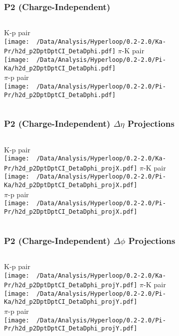 \documentclass{beamer}
\begin{document}
\begin{frame}
	\frametitle{P2 (Charge-Independent)}
	\begin{columns}
		\centering
		K-p pair\\
		\texttt{[image: ~/Data/Analysis/Hyperloop/0.2-2.0/Ka-Pr/h2d\_p2DptDptCI\_DetaDphi.pdf]}
		\centering
		$\pi$-K pair\\
		\texttt{[image: ~/Data/Analysis/Hyperloop/0.2-2.0/Pi-Ka/h2d\_p2DptDptCI\_DetaDphi.pdf]}\\$\pi$-p pair\\
		\texttt{[image: ~/Data/Analysis/Hyperloop/0.2-2.0/Pi-Pr/h2d\_p2DptDptCI\_DetaDphi.pdf]}
	\end{columns}
\end{frame}
\begin{frame}
	\frametitle{P2 (Charge-Independent) $\Delta\eta$ Projections}
	\begin{columns}
		\column{0.5\textwidth}
		\centering
		K-p pair\\
		\texttt{[image: ~/Data/Analysis/Hyperloop/0.2-2.0/Ka-Pr/h2d\_p2DptDptCI\_DetaDphi\_projX.pdf]}
		\column{0.5\textwidth}
		\centering
		$\pi$-K pair\\
		\texttt{[image: ~/Data/Analysis/Hyperloop/0.2-2.0/Pi-Ka/h2d\_p2DptDptCI\_DetaDphi\_projX.pdf]}\\$\pi$-p pair\\
		\texttt{[image: ~/Data/Analysis/Hyperloop/0.2-2.0/Pi-Pr/h2d\_p2DptDptCI\_DetaDphi\_projX.pdf]}
	\end{columns}
\end{frame}
\begin{frame}
	\frametitle{P2 (Charge-Independent) $\Delta\phi$ Projections}
	\begin{columns}
		\centering
		K-p pair\\
		\texttt{[image: ~/Data/Analysis/Hyperloop/0.2-2.0/Ka-Pr/h2d\_p2DptDptCI\_DetaDphi\_projY.pdf]}
		\centering
		$\pi$-K pair\\
		\texttt{[image: ~/Data/Analysis/Hyperloop/0.2-2.0/Pi-Ka/h2d\_p2DptDptCI\_DetaDphi\_projY.pdf]}\\$\pi$-p pair\\
		\texttt{[image: ~/Data/Analysis/Hyperloop/0.2-2.0/Pi-Pr/h2d\_p2DptDptCI\_DetaDphi\_projY.pdf]}
	\end{columns}
\end{frame}
\end{document}
